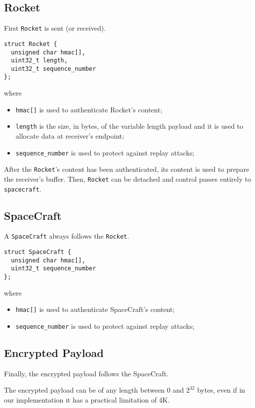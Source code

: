 \documentclass[a4paper,12pt]{article}
\begin{document}
\subsection{Rocket}
First \texttt{Rocket} is sent (or received).

\begin{verbatim}
struct Rocket {
  unsigned char hmac[],
  uint32_t length,
  uint32_t sequence_number
};
\end{verbatim}

where

\begin{itemize}
  \item \texttt{hmac[]} is used to authenticate Rocket's content;
  \item \texttt{length} is the size, in bytes, of the variable length payload and it is used to allocate data at receiver's endpoint;
  \item \texttt{sequence\_number} is used to protect against replay attacks;
\end{itemize}

After the \texttt{Rocket}'s content has been authenticated, its content is used to prepare the receiver's buffer.
Then, \texttt{Rocket} can be detached and control passes entirely to \texttt{spacecraft}.

\subsection{SpaceCraft}
A \texttt{SpaceCraft} always follows the \texttt{Rocket}.

\begin{verbatim}
struct SpaceCraft {
  unsigned char hmac[],
  uint32_t sequence_number
};
\end{verbatim}

where

\begin{itemize}
  \item \texttt{hmac[]} is used to authenticate SpaceCraft's content;
  \item \texttt{sequence\_number} is used to protect against replay attacks;
\end{itemize}

\subsection{Encrypted Payload}
Finally, the encrypted payload follows the SpaceCraft.

The encrypted payload can be of any length between 0 and $2^{32}$ bytes, even if in our implementation it has a practical limitation of 4K.
\end{document}
